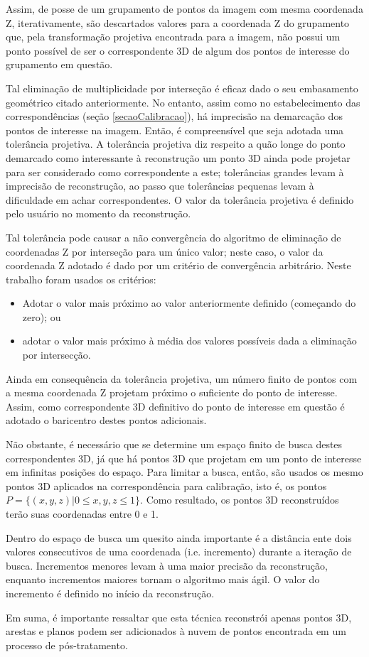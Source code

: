 	Assim, de posse de um grupamento de pontos da imagem com mesma coordenada Z, iterativamente, são descartados valores para a coordenada Z do grupamento que, pela transformação projetiva encontrada para a imagem, não possui um ponto possível de ser o correspondente 3D de algum dos pontos de interesse do grupamento em questão.
	
	Tal eliminação de multiplicidade por interseção é eficaz dado o seu embasamento geométrico citado anteriormente. No entanto, assim como no estabelecimento das correspondências (seção \ref{secaoCalibracao}), há imprecisão na demarcação dos pontos de interesse na imagem. Então, é compreensível que seja adotada uma tolerância projetiva. A tolerância projetiva diz respeito a quão longe do ponto demarcado como interessante à reconstrução um ponto 3D ainda pode projetar para ser considerado como correspondente a este; tolerâncias grandes levam à imprecisão de reconstrução, ao passo que tolerâncias pequenas levam à dificuldade em achar correspondentes. O valor da tolerância projetiva é definido pelo usuário no momento da reconstrução. 
	
	Tal tolerância pode causar a não convergência do algoritmo de eliminação de coordenadas Z por interseção para um único valor; neste caso, o valor da coordenada Z adotado é dado por um critério de convergência arbitrário. Neste trabalho foram usados os critérios:
	\begin{itemize}
		\item Adotar o valor mais próximo ao valor anteriormente definido (começando do zero); ou
		\item adotar o valor mais próximo à média dos valores possíveis dada a eliminação por intersecção.
	\end{itemize}
	
	Ainda em consequência da tolerância projetiva, um número finito de pontos com a mesma coordenada Z projetam próximo o suficiente do ponto de interesse. Assim, como correspondente 3D definitivo do ponto de interesse em questão é adotado o baricentro destes pontos adicionais.
	
	Não obstante, é necessário que se determine um espaço finito de busca destes correspondentes 3D, já que há pontos 3D que projetam em um ponto de interesse em infinitas posições do espaço. Para limitar a busca, então, são usados os mesmo pontos 3D aplicados na correspondência para calibração, isto é, os pontos $P = \{(x, y, z) | 0 \leq x, y, z \leq 1\}$. Como resultado, os pontos 3D reconstruídos terão suas coordenadas entre 0 e 1.
	
	Dentro do espaço de busca um quesito ainda importante é a distância ente dois valores consecutivos de uma coordenada (i.e. incremento) durante a iteração de busca. Incrementos menores levam à uma maior precisão da reconstrução, enquanto incrementos maiores tornam o algoritmo mais ágil. O valor do incremento é definido no início da reconstrução.
	
	Em suma, é importante ressaltar que esta técnica reconstrói apenas pontos 3D, arestas e planos podem ser adicionados à nuvem de pontos encontrada em um processo de pós-tratamento.
	
	